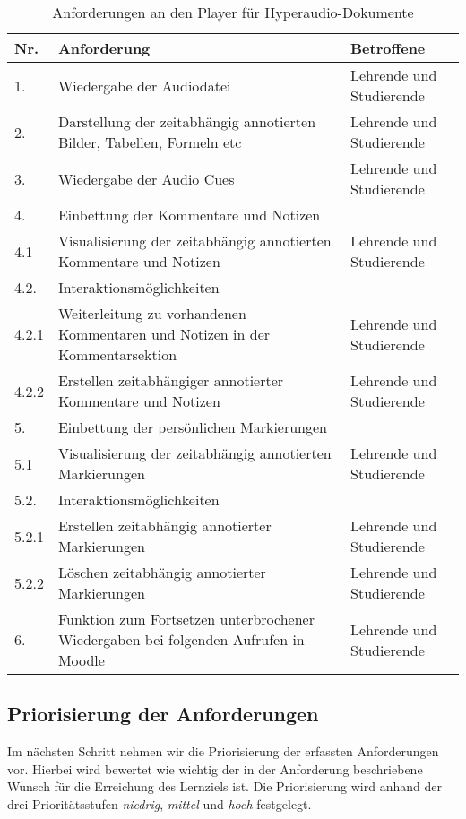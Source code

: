 \begin{table}[!ht]
\def\arraystretch{1.4}
\caption{Anforderungen an den Player für Hyperaudio-Dokumente}
\label{tab:AnforderungenPlayer}
 \begin{tabularx}{\textwidth}{lXl}      
    \hline
    Nr. & Anforderung & Betroffene 
    \\\hline
    1. & Wiedergabe der Audiodatei & Lehrende und Studierende\\
    2. & Darstellung der zeitabhängig annotierten Bilder, Tabellen, Formeln etc & Lehrende und Studierende\\
    3. & Wiedergabe der Audio Cues & Lehrende und Studierende\\
    4. & Einbettung der Kommentare und Notizen & \\
    4.1 & Visualisierung der zeitabhängig annotierten Kommentare und Notizen & Lehrende und Studierende\\
    4.2. & Interaktionsmöglichkeiten & \\
    4.2.1 & Weiterleitung zu vorhandenen Kommentaren und Notizen in der Kommentarsektion  & Lehrende und Studierende\\
    4.2.2 & Erstellen zeitabhängiger annotierter Kommentare und Notizen & Lehrende und Studierende\\
    5. & Einbettung der persönlichen Markierungen & \\
    5.1 & Visualisierung der zeitabhängig annotierten Markierungen & Lehrende und Studierende\\
    5.2. & Interaktionsmöglichkeiten & \\
    5.2.1 & Erstellen zeitabhängig annotierter Markierungen  & Lehrende und Studierende\\
    5.2.2 & Löschen zeitabhängig annotierter Markierungen & Lehrende und Studierende\\
    6. & Funktion zum Fortsetzen unterbrochener Wiedergaben bei folgenden Aufrufen in Moodle & Lehrende und Studierende\\
    \hline
    \end{tabularx}
\end{table}

\subsection{Priorisierung der Anforderungen}
Im nächsten Schritt nehmen wir die Priorisierung der erfassten Anforderungen vor. Hierbei wird bewertet wie wichtig der in der Anforderung beschriebene Wunsch für die Erreichung des Lernziels ist. Die Priorisierung wird anhand der drei Prioritätsstufen \textit{niedrig}, \textit{mittel} und \textit{hoch} festgelegt.

